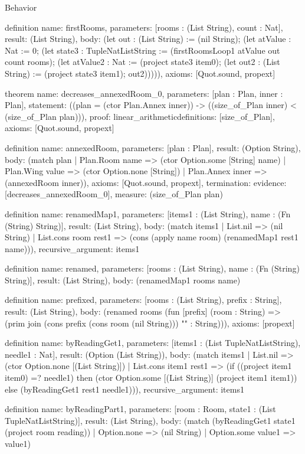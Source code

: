 \begin{lexlean}{Behavior}
\begin{semanticmodule}
definition{
  name: firstRooms,
  parameters: [rooms : (List String), count : Nat],
  result: (List String),
  body: (let out : (List String) := (nil String); (let atValue : Nat := 0; (let state3 : TupleNatListString := (firstRoomsLoop1 atValue out count rooms); (let atValue2 : Nat := (project state3 item0); (let out2 : (List String) := (project state3 item1); out2))))),
  axioms: [Quot.sound, propext]
}

theorem{
  name: decreases_annexedRoom_0,
  parameters: [plan : Plan, inner : Plan],
  statement: ((plan = (ctor Plan.Annex inner)) -> ((size_of_Plan inner) < (size_of_Plan plan))),
  proof: linear_arithmetic{definitions: [size_of_Plan]},
  axioms: [Quot.sound, propext]
}

definition{
  name: annexedRoom,
  parameters: [plan : Plan],
  result: (Option String),
  body: (match plan
    | Plan.Room name => (ctor Option.some [String] name)
    | Plan.Wing value => (ctor Option.none [String])
    | Plan.Annex inner => (annexedRoom inner)),
  axioms: [Quot.sound, propext],
  termination: {evidence: [decreases_annexedRoom_0], measure: (size_of_Plan plan)}
}

definition{
  name: renamedMap1,
  parameters: [items1 : (List String), name : (Fn (String) String)],
  result: (List String),
  body: (match items1
    | List.nil => (nil String)
    | List.cons room rest1 => (cons (apply name room) (renamedMap1 rest1 name))),
  recursive_argument: items1
}

definition{
  name: renamed,
  parameters: [rooms : (List String), name : (Fn (String) String)],
  result: (List String),
  body: (renamedMap1 rooms name)
}

definition{
  name: prefixed,
  parameters: [rooms : (List String), prefix : String],
  result: (List String),
  body: (renamed rooms (fun [prefix] (room : String) => (prim join (cons prefix (cons room (nil String))) "" : String))),
  axioms: [propext]
}

definition{
  name: byReadingGet1,
  parameters: [items1 : (List TupleNatListString), needle1 : Nat],
  result: (Option (List String)),
  body: (match items1
    | List.nil => (ctor Option.none [(List String)])
    | List.cons item1 rest1 => (if ((project item1 item0) =? needle1) then (ctor Option.some [(List String)] (project item1 item1)) else (byReadingGet1 rest1 needle1))),
  recursive_argument: items1
}

definition{
  name: byReadingPart1,
  parameters: [room : Room, state1 : (List TupleNatListString)],
  result: (List String),
  body: (match (byReadingGet1 state1 (project room reading))
    | Option.none => (nil String)
    | Option.some value1 => value1)
}


\end{semanticmodule}
\end{lexlean}
